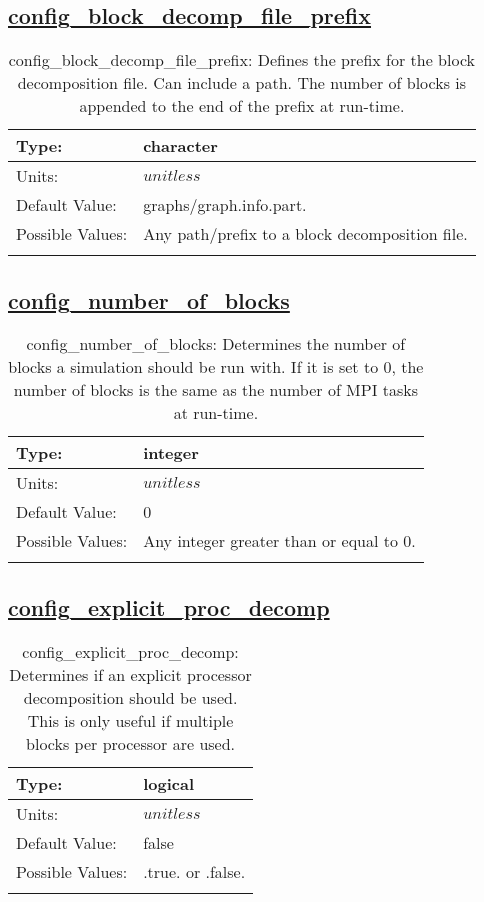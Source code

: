 \subsection[config\_block\_decomp\_file\_prefix]{\hyperref[sec:nm_tab_decomposition]{config\_block\_decomp\_file\_prefix}}
\label{subsec:nm_sec_config_block_decomp_file_prefix}
\begin{center}
\begin{longtable}{| p{2.0in} || p{4.0in} |}
    \hline
    Type: & character \\
    \hline
    Units: & $unitless$ \\
    \hline
    Default Value: & graphs/graph.info.part. \\
    \hline
    Possible Values: & Any path/prefix to a block decomposition file. \\
    \hline
    \caption{config\_block\_decomp\_file\_prefix: Defines the prefix for the block decomposition file. Can include a path. The number of blocks is appended to the end of the prefix at run-time.}
\end{longtable}
\end{center}
\subsection[config\_number\_of\_blocks]{\hyperref[sec:nm_tab_decomposition]{config\_number\_of\_blocks}}
\label{subsec:nm_sec_config_number_of_blocks}
\begin{center}
\begin{longtable}{| p{2.0in} || p{4.0in} |}
    \hline
    Type: & integer \\
    \hline
    Units: & $unitless$ \\
    \hline
    Default Value: & 0 \\
    \hline
    Possible Values: & Any integer greater than or equal to 0. \\
    \hline
    \caption{config\_number\_of\_blocks: Determines the number of blocks a simulation should be run with. If it is set to 0, the number of blocks is the same as the number of MPI tasks at run-time.}
\end{longtable}
\end{center}
\subsection[config\_explicit\_proc\_decomp]{\hyperref[sec:nm_tab_decomposition]{config\_explicit\_proc\_decomp}}
\label{subsec:nm_sec_config_explicit_proc_decomp}
\begin{center}
\begin{longtable}{| p{2.0in} || p{4.0in} |}
    \hline
    Type: & logical \\
    \hline
    Units: & $unitless$ \\
    \hline
    Default Value: & false \\
    \hline
    Possible Values: & .true. or .false. \\
    \hline
    \caption{config\_explicit\_proc\_decomp: Determines if an explicit processor decomposition should be used. This is only useful if multiple blocks per processor are used.}
\end{longtable}
\end{center}
